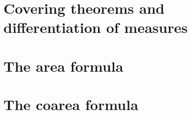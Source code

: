 \section{Covering theorems and differentiation of measures}

\section{The area formula}


\section{The coarea formula}


